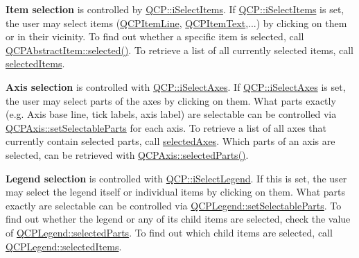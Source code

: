 {\bfseries Item selection} is controlled by \hyperlink{namespace_q_c_p_a2ad6bb6281c7c2d593d4277b44c2b037aea2f7c105d674e76d9b187b02ef29260}{Q\+C\+P\+::i\+Select\+Items}. If \hyperlink{namespace_q_c_p_a2ad6bb6281c7c2d593d4277b44c2b037aea2f7c105d674e76d9b187b02ef29260}{Q\+C\+P\+::i\+Select\+Items} is set, the user may select items (\hyperlink{class_q_c_p_item_line}{Q\+C\+P\+Item\+Line}, \hyperlink{class_q_c_p_item_text}{Q\+C\+P\+Item\+Text},...) by clicking on them or in their vicinity. To find out whether a specific item is selected, call \hyperlink{class_q_c_p_abstract_item_a225865808640d8d9a7dd19f09a2e93f2}{Q\+C\+P\+Abstract\+Item\+::selected()}. To retrieve a list of all currently selected items, call \hyperlink{class_q_custom_plot_a1a48b13547e2d9ac5cd6927516f47a2e}{selected\+Items}.

{\bfseries Axis selection} is controlled with \hyperlink{namespace_q_c_p_a2ad6bb6281c7c2d593d4277b44c2b037ad6644ac55bef621645326e9dd7469caa}{Q\+C\+P\+::i\+Select\+Axes}. If \hyperlink{namespace_q_c_p_a2ad6bb6281c7c2d593d4277b44c2b037ad6644ac55bef621645326e9dd7469caa}{Q\+C\+P\+::i\+Select\+Axes} is set, the user may select parts of the axes by clicking on them. What parts exactly (e.\+g. Axis base line, tick labels, axis label) are selectable can be controlled via \hyperlink{class_q_c_p_axis_a513f9b9e326c505d9bec54880031b085}{Q\+C\+P\+Axis\+::set\+Selectable\+Parts} for each axis. To retrieve a list of all axes that currently contain selected parts, call \hyperlink{class_q_custom_plot_aa6baf867e8beb96ed5bd471f83ece903}{selected\+Axes}. Which parts of an axis are selected, can be retrieved with \hyperlink{class_q_c_p_axis_a08323248a1cba4750ef07ceea159e0b3}{Q\+C\+P\+Axis\+::selected\+Parts()}.

{\bfseries Legend selection} is controlled with \hyperlink{namespace_q_c_p_a2ad6bb6281c7c2d593d4277b44c2b037a269c9af298e257d1108edec0432b5513}{Q\+C\+P\+::i\+Select\+Legend}. If this is set, the user may select the legend itself or individual items by clicking on them. What parts exactly are selectable can be controlled via \hyperlink{class_q_c_p_legend_a9ce60aa8bbd89f62ae4fa83ac6c60110}{Q\+C\+P\+Legend\+::set\+Selectable\+Parts}. To find out whether the legend or any of its child items are selected, check the value of \hyperlink{class_q_c_p_legend_abbbf1b2d6a149013527ed87b0780894a}{Q\+C\+P\+Legend\+::selected\+Parts}. To find out which child items are selected, call \hyperlink{class_q_c_p_legend_ac93eaf236e911d67aa8b88942ef45c5e}{Q\+C\+P\+Legend\+::selected\+Items}.

